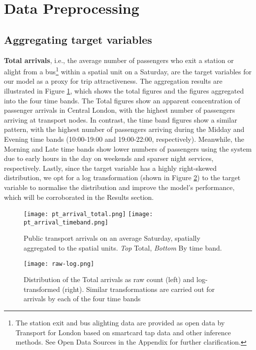 \pagebreak[4] %
\section{Data Preprocessing}
\subsection{Aggregating target variables}

\textbf{Total arrivals}, i.e., the average number of passengers who exit a station or alight from a bus\footnote{The station exit and bus alighting data are provided as open data by Transport for London based on smartcard tap data and other inference methods. See Open Data Sources in the Appendix for further clarification.} within a spatial unit on a Saturday, are the target variables for our model as a proxy for trip attractiveness. The aggregation results are illustrated in Figure \ref{fig:ptarrival}, which shows the total figures and the figures aggregated into the four time bands. The Total figures show an apparent concentration of passenger arrivals in Central London, with the highest number of passengers arriving at transport nodes. In contrast, the time band figures show a similar pattern, with the highest number of passengers arriving during the Midday and Evening time bands (10:00-19:00 and 19:00-22:00, respectively). Meanwhile, the Morning and Late time bands show lower numbers of passengers using the system due to early hours in the day on weekends and sparser night services, respectively. Lastly, since the target variable has a highly right-skewed distribution, we opt for a log transformation (shown in Figure \ref{fig:rawlog}) to the target variable to normalise the distribution and improve the model's performance, which will be corroborated in the Results section.

\begin{figure}[!ht]
    \centering
    \texttt{[image: pt\_arrival\_total.png]}
    \centering
    \texttt{[image: pt\_arrival\_timeband.png]}
    \captionsetup{justification=centering}
    \caption{Public transport arrivals on an average Saturday, spatially aggregated to the spatial units. \textit{Top} Total, \textit{Bottom} By time band.}
    \label{fig:ptarrival}
\end{figure}

\begin{figure}[!hb]
    \centering
    \texttt{[image: raw-log.png]}
    \captionsetup{justification=centering}
    \caption{Distribution of the Total arrivals as raw count (left) and log-transformed (right). Similar transformations are carried out for arrivals by each of the four time bands}
    \label{fig:rawlog}
\end{figure}

